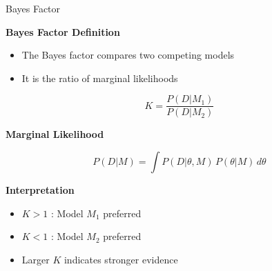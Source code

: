 \documentclass[aspectratio=169]{beamer}
\begin{document}
\begin{frame}{Bayes Factor}

\footnotesize

\textbf{Bayes Factor Definition}

\begin{itemize}

\item The Bayes factor compares two competing models

\item It is the ratio of marginal likelihoods

\end{itemize}

\vspace{0.2cm}

\begin{equation}
K = \frac{P(D|M_1)}{P(D|M_2)}
\end{equation}

\vspace{0.2cm}

\textbf{Marginal Likelihood}

\begin{equation}
P(D|M) = \int P(D|\theta, M)\, P(\theta|M)\, d\theta
\end{equation}

\vspace{0.2cm}

\textbf{Interpretation}

\begin{itemize}

\item $K > 1$ : Model $M_1$ preferred

\item $K < 1$ : Model $M_2$ preferred

\item Larger $K$ indicates stronger evidence

\end{itemize}

\end{frame}
\end{document}
